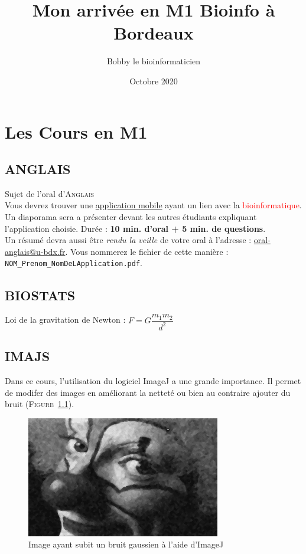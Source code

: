 \documentclass[10 pt]{report} %
\title{Mon arrivée en M1 Bioinfo à Bordeaux}
\author{Bobby le bioinformaticien}
\date{Octobre 2020}
\begin{document}
\maketitle

\renewcommand{\contentsname}{Sommaire}
\tableofcontents
\thispagestyle{empty}


\newpage
\setcounter{page}{1}
\chapter{Les Cours en M1}
    \section{ANGLAIS}
    
        {\Huge Sujet de l'oral d'\textsc{Anglais}}\\
        \noindent Vous devrez trouver une \underline{application mobile} ayant un lien avec la \textcolor{red}{bioinformatique}. Un diaporama sera a présenter devant les autres étudiants expliquant l'application choisie. Durée : \textbf{10 min. d'oral + 5 min. de questions}.\\ 
        \indent Un résumé devra aussi être \textit{rendu la veille} de votre oral à l'adresse : \href{mailto:oral-anglais@u-bdx.fr}{oral-anglais@u-bdx.fr}. Vous nommerez le fichier de cette manière : \\ \texttt{NOM\_Prenom\_NomDeLApplication.pdf}.

    \section{BIOSTATS}
        Loi de la gravitation de Newton :
        \begin{math}
            F=G \dfrac{m_1 m_2}{d^2}
        \end{math}
    
    \section{IMAJS}
        Dans ce cours, l'utilisation du logiciel ImageJ a une grande importance. Il permet de modifer des images en améliorant la netteté ou bien au contraire ajouter du bruit (\textsc{Figure}~\ref{fig:clown}).
        
        \begin{figure}[h]
            \centering
            \includegraphics[scale=0.4]{clown_Noise-gaussian_Filter_Median-1-3fois.png}
            \caption{Image ayant subit un bruit gaussien à l'aide d'ImageJ}
            \label{fig:clown}
        \end{figure}
        
\end{document}
